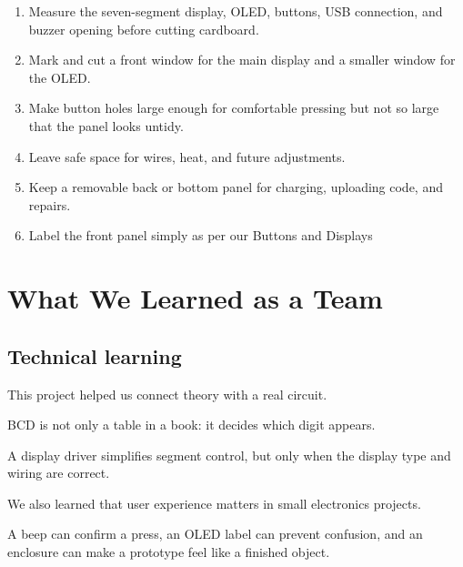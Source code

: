 \documentclass[12pt,letterpaper]{article}
\newcommand{\ProjectImage}[3][0.76]{%

%
}
\begin{document}
\begin{enumerate}

  \item
  Measure the seven-segment display,
  OLED,
  buttons,
  USB connection,
  and buzzer opening before cutting cardboard.

  \item
  Mark and cut a front window
  for the main display
  and a smaller window for the OLED.

  \item
  Make button holes large enough
  for comfortable pressing
  but not so large that the panel looks untidy.

  \item
  Leave safe space for wires,
  heat,
  and future adjustments.

  \item
  Keep a removable back or bottom panel
  for charging,
  uploading code,
  and repairs.

  \item
  Label the front panel simply as per our Buttons and Displays
  
\end{enumerate}

\ProjectImage{cardboard-enclosure-sketch.jpg}{
Our cardboard enclosure sketch,
measurement plan,
or first assembled box.
}

\clearpage
\section{What We Learned as a Team}

\subsection{Technical learning}

This project helped us connect theory
with a real circuit.

BCD is not only a table in a book:
it decides which digit appears.

A display driver simplifies segment control,
but only when the display type
and wiring are correct.

We also learned that user experience matters
in small electronics projects.

A beep can confirm a press,
an OLED label can prevent confusion,
and an enclosure can make a prototype
feel like a finished object.
\end{document}
